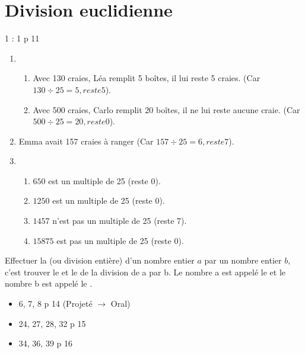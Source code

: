 \documentclass[12pt,a4paper]{article}
\date{}
\title{}
\begin{document}




\section{Division euclidienne}

\begin{myact}{1 : 1 p 11}
	\begin{enumerate}
		\item  
		\begin{enumerate}[label=\alph*. ]
			\item Avec 130 craies, Léa remplit 5 boîtes, il lui reste 5 craies. (Car $130 \div 25 = 5, reste 5$).
			\item Avec 500 craies, Carlo remplit 20 boîtes, il ne lui reste aucune craie. (Car $500 \div 25 = 20, reste 0$).
		\end{enumerate}
		
		\item Emma avait 157 craies à ranger (Car $157 \div 25 = 6, reste 7 $).
		
		\item \begin{enumerate}[label=\alph*. ]
			\item $650$ est un multiple de 25 (reste 0).
			\item $1250$ est un multiple de 25 (reste 0).
			\item $1457$ n'est pas un multiple de 25 (reste 7).
			\item $15875$ est pas un multiple de 25 (reste 0).
		\end{enumerate}
		
	\end{enumerate}
\end{myact}

\begin{mybilan}
	Effectuer la  (ou division entière) d’un nombre entier $a$ par un nombre entier $b$, c’est trouver le  et le  de la division de a par b.
	Le nombre a est appelé le  et le nombre b est appelé le .
\end{mybilan}

\begin{myexos}
	\begin{itemize}
		\item 6, 7, 8 p 14 (Projeté $\rightarrow$ Oral)
		\item 24, 27, 28, 32 p 15
		\item 34, 36, 39 p 16
	\end{itemize}
	
\end{myexos}
\end{document}
